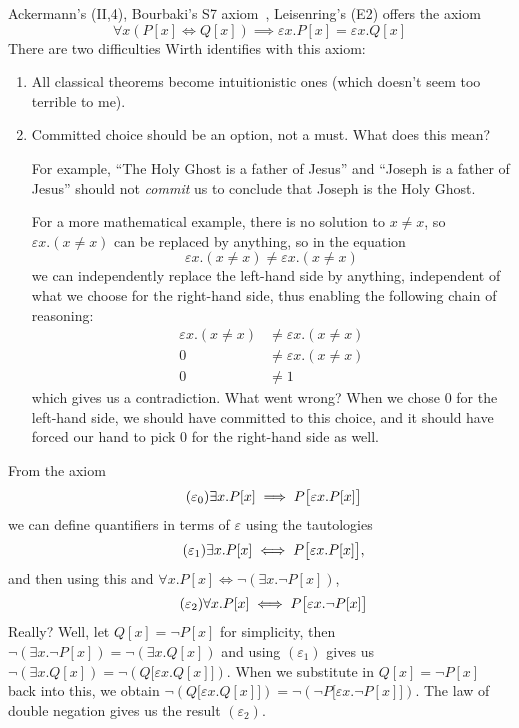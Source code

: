 \begin{node}\label{epsilon-calc-0007}%
Ackermann's (II,4), Bourbaki's S7 axiom~\cite[I~\S5.1]{bourbaki1968theory}, Leisenring's (E2)
offers the axiom
\[\forall x(P[x]\iff Q[x])\implies \varepsilon x.P[x] = \varepsilon x.Q[x]\]
There are two difficulties Wirth identifies with this axiom:
\begin{enumerate}
\item All classical theorems become intuitionistic ones (which doesn't
  seem too terrible to me).
\item Committed choice should be an option, not a must. What does this mean?

  For example, ``The Holy Ghost is a father of Jesus'' and ``Joseph is a
  father of Jesus'' should not \emph{commit} us to conclude that Joseph is the
  Holy Ghost.

  For a more mathematical example, there is no solution to
  $x\neq x$, so $\varepsilon x.(x\neq x)$ can be replaced by anything,
  so in the equation
\begin{equation*}
\varepsilon x.(x\neq x)\neq\varepsilon x.(x\neq x)
\end{equation*}
we can independently replace the left-hand side by anything, independent
of what we choose for the right-hand side, thus enabling the following
chain of reasoning:
\begin{align*}
\varepsilon x.(x\neq x)&\neq\varepsilon x.(x\neq x)\\
0&\neq\varepsilon x.(x\neq x)\\
0&\neq1
\end{align*}
which gives us a contradiction. What went wrong? When we chose 0 for the
left-hand side, we should have committed to this choice, and it should
have forced our hand to pick 0 for the right-hand side as well.
\end{enumerate}
\end{node}

\begin{node}[Quantifiers]\label{epsilon-calc-0008}%
From the axiom
\begin{equation*}\tag{$\varepsilon_{0}$}
\exists x.P[x] \implies P\bigl[\varepsilon x.P[x]\bigr]
\end{equation*}
we can define quantifiers in terms of $\varepsilon$ using the tautologies
\begin{equation*}\tag{$\varepsilon_{1}$}
\exists x.P[x]\iff P\bigl[\varepsilon x.P[x]\bigr],
\end{equation*}
and then using this and $\forall x.P[x]\iff\neg(\exists x.\neg P[x])$,
\begin{equation*}\tag{$\varepsilon_{2}$}
\forall x.P[x]\iff P\bigl[\varepsilon x.\neg P[x]\bigr]
\end{equation*}
Really? Well, let $Q[x]=\neg P[x]$ for simplicity,
then $\neg(\exists x.\neg P[x])=\neg(\exists x.Q[x])$ and using $(\varepsilon_{1})$
gives us
$\neg(\exists x.Q[x])=\neg(Q\bigl[\varepsilon x.Q[x]\bigr])$. When we
substitute in $Q[x]=\neg P[x]$ back into this, we obtain
$\neg(Q\bigl[\varepsilon x.Q[x]\bigr])=\neg(\neg P\bigl[\varepsilon x.\neg P[x]\bigr])$.
The law of double negation gives us the result $(\varepsilon_{2})$.
\end{node}

